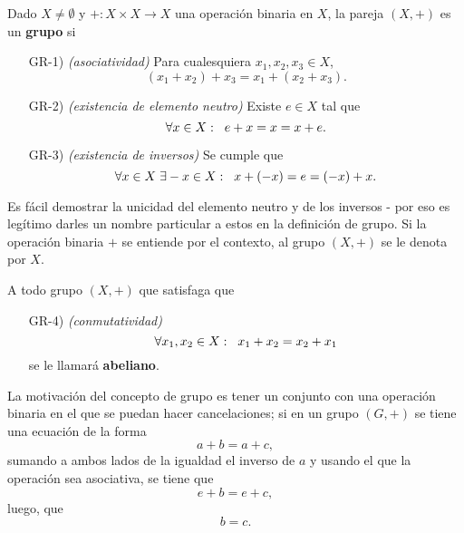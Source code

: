 \begin{defi}
Dado $X \neq \emptyset$ y $+: X \times X \longrightarrow X$
una operación binaria en $X$, la pareja $(X, +)$ es un \textbf{grupo}
si 
\begin{itemize}
	\item[GR-1)] \textit{(asociatividad)} Para cualesquiera 
	$x_{1}, x_{2}, x_{3} \in X$,
	\begin{equation}
		\label{eq: grupo asociatividad}
		(x_{1} + x_{2} ) + x_{3} = x_{1} + (x_{2} + x_{3}).
	\end{equation}
	\item[GR-2)] \textit{(existencia de elemento neutro)} Existe
	$e \in X$ tal que 
	\begin{equation}
		\label{eq: grupo e}
		\forall x \in X: \hspace{0.2cm}
		e + x = x = x + e.
	\end{equation}
	\item[GR-3)] \textit{(existencia de inversos)} 
	Se cumple que 
	\begin{equation}
		\label{eq: grupo inversos}
		\forall x \in X \hspace{0.1cm}
		\exists -x \in X: \hspace{0.2cm}
		x + (-x) = e = (-x) + x.
	\end{equation}
\end{itemize}
\end{defi}
Es fácil demostrar la unicidad del elemento neutro y de los inversos
- por eso es legítimo darles un nombre particular a estos en la 
definición de grupo.
Si la operación binaria $+$ se entiende por el contexto, al grupo
$(X, +)$ se le denota por $X$.
\begin{defi}
A todo grupo $(X, +)$ que satisfaga que 
\begin{itemize}
	\item[GR-4)] \textit{(conmutatividad)}
	\begin{equation}
		\label{eq: grupo conmut}
		\forall x_{1}, x_{2} \in X : \hspace{0.2cm}
		x_{1} + x_{2} = x_{2} + x_{1}
	\end{equation}
	se le llamará \textbf{abeliano}.
\end{itemize}
\end{defi}


La motivación del concepto de grupo es tener un conjunto con una
operación binaria en el que se puedan hacer cancelaciones;
si en un grupo $(G, +)$ se tiene una ecuación de la forma
\[
a + b = a + c,
\]
sumando a ambos lados de la igualdad el inverso de $a$ 
y usando el que la operación sea asociativa, se tiene que 
\[
e + b = e + c,
\]
luego, que 
\[
b = c.
\]

